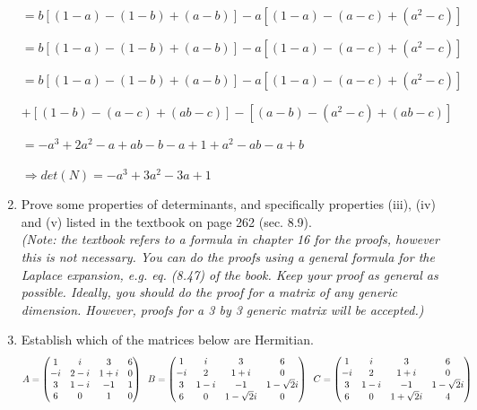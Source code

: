 \documentclass[fleqn]{article}
\begin{document}
\begin{enumerate}
      \bigbreak

      \textcolor{hwColor}{$=b\left[(1-a)-(1-b)+(a-b)\right]-a\left[(1-a)-(a-c)+(a^2-c)\right]$}

      \textcolor{hwColor}{$=b\left[(1-a)-(1-b)+(a-b)\right]-a\left[(1-a)-(a-c)+(a^2-c)\right]$}

      \textcolor{hwColor}{$=b\left[(1-a)-(1-b)+(a-b)\right]-a\left[(1-a)-(a-c)+(a^2-c)\right]$}

      \textcolor{hwColor}{$+\left[(1-b)-(a-c)+(ab-c)\right]-\left[(a-b)-(a^2-c)+(ab-c)\right]$}

      \textcolor{hwColor}{$=-a^3+2a^2-a+ab-b-a+1+a^2-ab-a+b$}
   
      \textcolor{hwColor}{    
        $
        \Longrightarrow
        det(N)=-a^3+3a^2-3a+1
        $
      }


    \item Prove some properties of determinants, and specifically properties (iii), (iv) and (v) listed in the textbook on page 262 (sec. 8.9). \\
    \emph{(Note: the textbook refers to a formula in chapter 16 for the proofs, however this is not necessary. You can do the proofs using a general formula for the Laplace expansion, e.g. eq. (8.47) of the book. Keep your proof as general as possible. Ideally, you should do the proof for a matrix of any generic dimension. However, proofs for a 3 by 3 generic matrix will be accepted.) }


    \item Establish which of the matrices below are Hermitian. $$A = 
      \begin{pmatrix}
        1 & i & 3 & 6 \\
        -i & 2-i & 1+i  & 0 \\
        3 & 1-i & -1 & 1 \\
        6 & 0 & 1 & 0 \\
      \end{pmatrix}\hskip 0.2truecm 
      B=\begin{pmatrix}
        1 & i & 3 & 6 \\
        -i & 2 & 1+i  & 0 \\
        3 & 1-i & -1 & 1-\sqrt{2}i \\
        6 & 0 & 1-\sqrt{2}i & 0 \\
      \end{pmatrix}
      \hskip 0.2truecm 
      C=\begin{pmatrix}
        1 & i & 3 & 6 \\
        -i & 2 & 1+i  & 0 \\
        3 & 1-i & -1 & 1-\sqrt{2}i \\
        6 & 0 & 1+\sqrt{2}i & 4 \\
      \end{pmatrix}
      $$


\end{enumerate}
\end{document}
